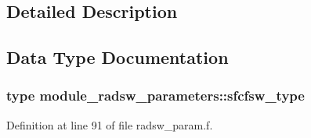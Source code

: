 \subsection{Detailed Description}


\subsection{Data Type Documentation}
\label{structmodule__radsw__parameters_1_1sfcfsw__type}
\hypertarget{group__module__radsw__main_structmodule__radsw__parameters_1_1sfcfsw__type}{}
\subsubsection{type module\+\_\+radsw\+\_\+parameters\+:\+:sfcfsw\+\_\+type}


Definition at line 91 of file radsw\+\_\+param.\+f.



